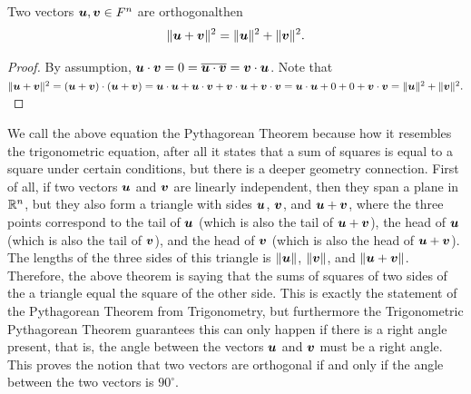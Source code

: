 \begin{Thm} \label{thm:pythagorean}
Two vectors $\boldsymbol u, \boldsymbol v\in F^n$ are orthogonal\footnotemark[8] then \[\Vert \boldsymbol u + \boldsymbol v\Vert^2 = \Vert \boldsymbol u\Vert^2+ \Vert \boldsymbol v\Vert^2.\]
\end{Thm}
\begin{proof}By assumption, $\boldsymbol u\cdot \boldsymbol v =0 = \overline{\boldsymbol u\cdot\boldsymbol v} = \boldsymbol v\cdot \boldsymbol u$. Note that
$\Vert \boldsymbol u + \boldsymbol v\Vert^2 = (\boldsymbol u + \boldsymbol v)\cdot(\boldsymbol u + \boldsymbol v) = \boldsymbol u\cdot \boldsymbol u + \boldsymbol u\cdot \boldsymbol v + \boldsymbol v\cdot \boldsymbol u + \boldsymbol v\cdot \boldsymbol v = \boldsymbol u\cdot \boldsymbol u + 0 + 0+ \boldsymbol v\cdot \boldsymbol v = \Vert \boldsymbol u\Vert^2+ \Vert \boldsymbol v\Vert^2.$  
\end{proof}\vs

We call the above equation the Pythagorean Theorem because how it resembles the trigonometric equation, after all it states that a sum of squares is equal to a square under certain conditions, but there is a deeper geometry connection. First of all, if two vectors $\boldsymbol u$ and $\boldsymbol v$ are linearly independent, then they span a plane in $\mathbb{R}^n$, but they also form a triangle with sides $\boldsymbol u$, $\boldsymbol v$, and $\boldsymbol u + \boldsymbol v$, where the three points correspond to the tail of $\boldsymbol u$ (which is also the tail of $\boldsymbol u + \boldsymbol v$), the head of $\boldsymbol u$ (which is also the tail of $\boldsymbol v$), and the head of $\boldsymbol v$ (which is also the head of $\boldsymbol u + \boldsymbol v$). The lengths of the three sides of this triangle is $\Vert \boldsymbol u\Vert$, $\Vert \boldsymbol v\Vert$, and $\Vert \boldsymbol u + \boldsymbol v\Vert$. Therefore, the above theorem is saying that the sums of squares of two sides of the a triangle equal the square of the other side. This is exactly the statement of the Pythagorean Theorem from Trigonometry, but furthermore the Trigonometric Pythagorean Theorem guarantees this can only happen if there is a right angle present, that is, the angle between the vectors $\boldsymbol u$ and $\boldsymbol v$ must be a right angle. This proves the notion that two vectors are orthogonal if and only if the angle between the two vectors is $90^\circ$.\\

